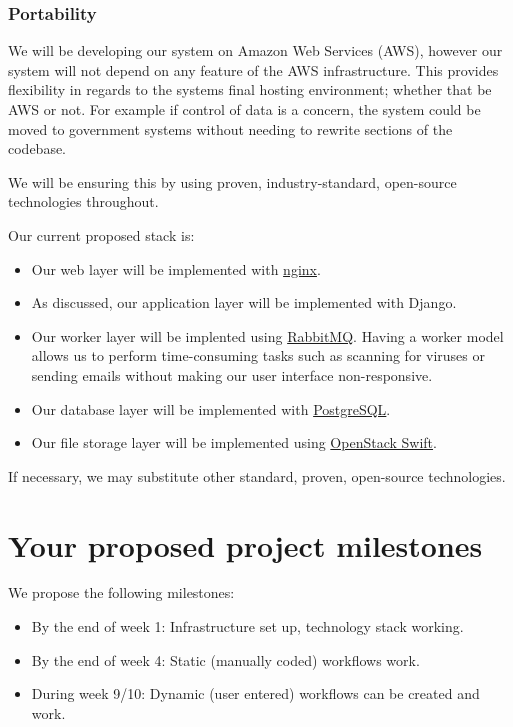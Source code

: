 \documentclass[12pt]{article}
\begin{document}
\subsubsection{Portability}

We will be developing our system on Amazon Web Services (AWS), however
our system will not depend on any feature of the AWS infrastructure.
This provides flexibility in regards to the systems final hosting
environment; whether that be AWS or not. For example if control of data
is a concern, the system could be moved to government systems without
needing to rewrite sections of the codebase.

We will be ensuring this by using proven, industry-standard, open-source
technologies throughout.

Our current proposed stack is:
\begin{itemize}
\item Our web layer will be implemented with
  \href{http://nginx.org/en}{nginx}.
\item As discussed, our application layer will be implemented with
  Django.
\item Our worker layer will be implented using
  \href{http://rabbitmq.com}{RabbitMQ}. Having a worker model allows
  us to perform time-consuming tasks such as scanning for viruses or
  sending emails without making our user interface
  non-responsive. 
\item Our database layer will be implemented with
  \href{http://postgresql.org}{PostgreSQL}. 
\item Our file storage layer will be implemented using
  \href{http://swift.openstack.org}{OpenStack Swift}.
\end{itemize}

If necessary, we may substitute other standard, proven, open-source
technologies.

\section{Your proposed project milestones}

We propose the following milestones:

\begin{itemize}
\item
  By the end of week 1: Infrastructure set up, technology stack working.
\item
  By the end of week 4: Static (manually coded) workflows work.
\item
  During week 9/10: Dynamic (user entered) workflows can be created and
  work.
\end{itemize}
\end{document}
